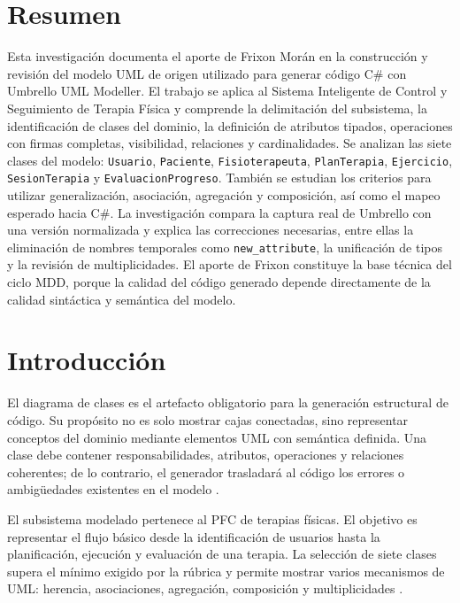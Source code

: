 



\tableofcontents
\clearpage
{}

\section{Resumen}
Esta investigación documenta el aporte de Frixon Morán en la construcción y revisión del modelo UML de origen utilizado para generar código C\# con Umbrello UML Modeller. El trabajo se aplica al Sistema Inteligente de Control y Seguimiento de Terapia Física y comprende la delimitación del subsistema, la identificación de clases del dominio, la definición de atributos tipados, operaciones con firmas completas, visibilidad, relaciones y cardinalidades. Se analizan las siete clases del modelo: \texttt{Usuario}, \texttt{Paciente}, \texttt{Fisioterapeuta}, \texttt{PlanTerapia}, \texttt{Ejercicio}, \texttt{SesionTerapia} y \texttt{EvaluacionProgreso}. También se estudian los criterios para utilizar generalización, asociación, agregación y composición, así como el mapeo esperado hacia C\#. La investigación compara la captura real de Umbrello con una versión normalizada y explica las correcciones necesarias, entre ellas la eliminación de nombres temporales como \texttt{new\_attribute}, la unificación de tipos y la revisión de multiplicidades. El aporte de Frixon constituye la base técnica del ciclo MDD, porque la calidad del código generado depende directamente de la calidad sintáctica y semántica del modelo.

\section{Introducción}
El diagrama de clases es el artefacto obligatorio para la generación estructural de código. Su propósito no es solo mostrar cajas conectadas, sino representar conceptos del dominio mediante elementos UML con semántica definida. Una clase debe contener responsabilidades, atributos, operaciones y relaciones coherentes; de lo contrario, el generador trasladará al código los errores o ambigüedades existentes en el modelo \cite{OMG2017UML,Brambilla2017}.

El subsistema modelado pertenece al PFC de terapias físicas. El objetivo es representar el flujo básico desde la identificación de usuarios hasta la planificación, ejecución y evaluación de una terapia. La selección de siete clases supera el mínimo exigido por la rúbrica y permite mostrar varios mecanismos de UML: herencia, asociaciones, agregación, composición y multiplicidades \cite{GuiaMDD2026}.

